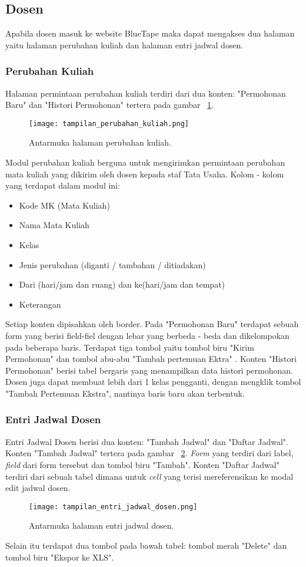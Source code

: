 \subsection{Dosen} 
Apabila dosen masuk ke website BlueTape maka dapat mengakses dua halaman yaitu halaman perubahan kuliah dan halaman entri jadwal dosen.

\subsubsection{Perubahan Kuliah}
Halaman permintaan perubahan kuliah terdiri dari dua konten: "Permohonan Baru" dan "Histori Permohonan" tertera pada gambar ~\ref{fig:tampilanPerubahanKuliah}. 
\begin{figure} [H]
	\centering  
	\texttt{[image: tampilan\_perubahan\_kuliah.png]} 
	\caption{Antarmuka halaman perubahan kuliah.} 
	\label{fig:tampilanPerubahanKuliah}
\end{figure}
Modul perubahan kuliah berguna untuk mengirimkan permintaan perubahan mata kuliah yang dikirim oleh dosen kepada staf Tata Usaha. Kolom - kolom yang terdapat dalam modul ini:
\begin{itemize}
	\item Kode MK (Mata Kuliah)
	\item Nama Mata Kuliah
	\item Kelas
	\item Jenis perubahan (diganti / tambahan / ditiadakan)
	\item Dari (hari/jam dan ruang) dan ke(hari/jam dan tempat)
	\item Keterangan
\end{itemize}
Setiap konten dipisahkan oleh border. Pada "Permohonan Baru" terdapat sebuah form yang berisi field-fiel dengan lebar yang berbeda - beda dan dikelompokan pada beberapa baris. Terdapat tiga tombol yaitu tombol biru "Kirim Permohonan" dan tombol abu-abu "Tambah pertemuan Ektra" .
Konten "Histori Permohonan" berisi tabel bergaris yang menampilkan data histori permohonan. \noindent
Dosen juga dapat membuat lebih dari 1 kelas pengganti, dengan mengklik tombol "Tambah Pertemuan Ekstra", nantinya baris baru akan terbentuk. 
\subsubsection{Entri Jadwal Dosen}
Entri Jadwal Dosen berisi dua konten: "Tambah Jadwal" dan "Daftar Jadwal". Konten "Tambah Jadwal" tertera pada gambar ~\ref{fig:tampilanEntriJadwalDosen}. \textit{Form} yang terdiri dari label, \textit{field} dari form tersebut dan tombol biru "Tambah". Konten "Daftar Jadwal" terdiri dari sebuah tabel dimana untuk \textit{cell} yang terisi mereferensikan ke modal edit jadwal dosen. 
\begin{figure} [H]
	\centering  
	\texttt{[image: tampilan\_entri\_jadwal\_dosen.png]} 
	\caption{Antarmuka halaman entri jadwal dosen.} 
	\label{fig:tampilanEntriJadwalDosen}
\end{figure}
Selain itu terdapat dua tombol pada bawah tabel: tombol merah "Delete" dan tombol biru "Ekspor ke XLS".
